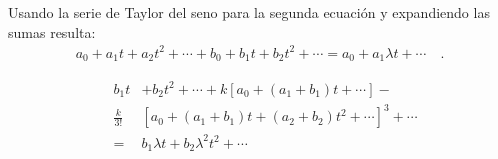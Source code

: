 \documentclass[11pt]{beamer}
\theoremstyle{definition}
\begin{document}
\begin{frame}
Usando la serie de Taylor del seno para la segunda ecuaci\'on y expandiendo las sumas resulta:
\centering
\begin{eqnarray*}
	a_{0}+a_{1}t+a_{2}t^{2}+\cdots +b_{0}+b_{1}t+b_{2}t^{2}+ \cdots=a_{0}+a_{1}\lambda t+\cdots\quad .
\end{eqnarray*}

\begin{eqnarray*}
	&b_{1}t&+b_{2}t^{2}+\cdots+k\left[a_{0}+(a_{1}+b_{1})t+\cdots\right]-\nonumber\\
	&\frac{k}{3!}&\left[a_{0}+(a_{1}+b_{1})t+(a_{2}+b_{2})t^{2}+\cdots\right]^{3}+\cdots\nonumber\\
	&=&b_{1}\lambda t+b_{2}\lambda^{2}t^{2}+\cdots
\end{eqnarray*}
\end{frame}
\end{document}
